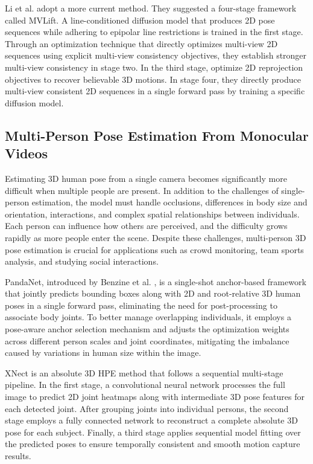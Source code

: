 Li et al. \cite{li2025lifting} adopt a more current method. They suggested a four-stage framework called MVLift. A line-conditioned diffusion model that produces 2D pose sequences while adhering to epipolar line restrictions is trained 
in the first stage. Through an optimization technique that directly optimizes multi-view 2D sequences using explicit multi-view consistency objectives, they establish stronger multi-view consistency in stage two. In the third stage, 
optimize 2D reprojection objectives to recover believable 3D motions. In stage four, they directly produce multi-view consistent 2D sequences in a single forward pass by training a specific diffusion model.


\subsection{Multi-Person Pose Estimation From Monocular Videos}
Estimating 3D human pose from a single camera becomes significantly more difficult when multiple people are present. In addition to the challenges of single-person estimation, the model must handle occlusions, differences in body size 
and orientation, interactions, and complex spatial relationships between individuals. Each person can influence how others are perceived, and the difficulty grows rapidly as more people enter the scene. Despite these challenges, 
multi-person 3D pose estimation is crucial for applications such as crowd monitoring, team sports analysis, and studying social interactions.


PandaNet, introduced by Benzine et al. \cite{benzine2020pandanet}, is a single-shot anchor-based framework that jointly predicts bounding boxes along with 2D and root-relative 3D human poses in a single forward pass, eliminating the need for post-processing 
to associate body joints. To better manage overlapping individuals, it employs a pose-aware anchor selection mechanism and adjusts the optimization weights across different person scales and joint coordinates, mitigating the imbalance 
caused by variations in human size within the image.

XNect \cite{mehta2020xnect} is an absolute 3D HPE method that follows a sequential multi-stage pipeline. In the first stage, a convolutional neural network processes the full image to predict 2D joint heatmaps along with intermediate 3D 
pose features for each detected joint. After grouping joints into individual persons, the second stage employs a fully connected network to reconstruct a complete absolute 3D pose for each subject. Finally, a third stage applies 
sequential model fitting over the predicted poses to ensure temporally consistent and smooth motion capture results.


